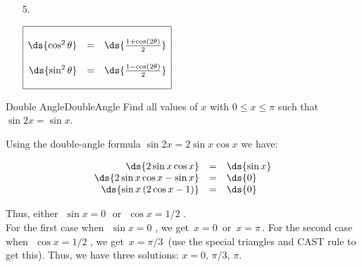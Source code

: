 \begin{multicols}{2}
\begin{enumerate}
\vspace{4mm} 
\item[5.] 

$ \begin{array}{|rcl|} \hline 
&& \\
\ds{\cos^2\theta} & = & \ds{\frac{1+\cos(2\theta)}{2}} \\
&& \\
\ds{\sin^2\theta} & = & \ds{\frac{1-\cos(2\theta)}{2}} \\
&& \\ \hline 
\end{array} $

\end{enumerate}
\end{multicols}

\begin{example}{Double Angle}{DoubleAngle}
Find all values of $x$ with $0\leq x\leq \pi$ such that $\sin 2x=\sin x$.
\end{example}

\begin{solution} 
Using the double-angle formula $\sin 2x = 2\sin x \cos x$ we have:

\hspace{3cm} $$\begin{array}{rcl}
\ds{2\sin x\cos x} & = & \ds{\sin x} \\
\ds{2\sin x\cos x- \sin x} & = & \ds{0} \\
\ds{\sin x \, (2\cos x - 1)} & = & \ds{0} \\
\end{array}$$

Thus, either \hspace{1cm} $\,\, \sin x=0 \,\, $ or $\,\, \cos x = 1/2\,\, $. \\

For the first case when $\,\, \sin x = 0 \,\, $, we get $\, x=0 \, $ or $\, x=\pi \,$.
For the second case when $\,\,\cos x = 1/2 \,\,$, we get $\, x=\pi/3 \,$ (use the special triangles and CAST rule to get this).
Thus, we have three solutions: $x=0, \, \pi/3, \, \pi$.
\end{solution}